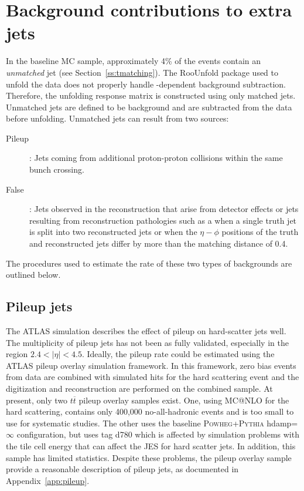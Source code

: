 \section{Background contributions to extra jets}
\label{ss:pileup}
In the baseline MC sample, approximately 4\% of the events contain an \textit{unmatched} jet (see Section~\ref{ss:tmatching}). The RooUnfold package used to unfold the data does not properly handle \pT-dependent background subtraction. Therefore, the unfolding response matrix is constructed using only matched jets. Unmatched jets are defined to be background and are subtracted from the data before unfolding. 
Unmatched jets can result from two sources: 
\begin{description}
\item[Pileup]: Jets coming from additional proton-proton collisions within the same bunch crossing.
\item[False]: Jets observed in the reconstruction that arise from detector effects or jets resulting from reconstruction pathologies such as a when a single truth jet is split into two reconstructed jets or when the $\eta-\phi$ positions of the truth and reconstructed jets differ by more than the matching distance of 0.4.
\end{description}
The  procedures used to estimate the rate of these two types of backgrounds are outlined below.

\subsection{Pileup jets}


The ATLAS simulation describes the effect of pileup on hard-scatter jets well.~\cite{jetpile} The multiplicity of pileup jets has not been as fully validated, especially in the region $2.4 < |\eta| < 4.5$.  Ideally, the pileup rate could be
estimated using the ATLAS pileup overlay simulation framework.  In this framework,
zero bias events from data are combined with simulated hits for the hard scattering event
and the digitization and reconstruction are performed on the combined sample.  At present,
only two $t\overline t$ pileup overlay samples exist.  One, using \textsc{ MC@NLO} for the hard scattering,
contains only 400,000 no-all-hadronic events and is too small to use for
systematic studies.  The other uses the baseline \textsc{ Powheg+Pythia} hdamp=$\infty$
configuration, but uses tag d780 which  is affected by simulation problems with the tile cell 
energy that can affect the JES for hard scatter jets.  In addition, this sample has
limited statistics.   Despite these problems, the pileup overlay sample
provide a reasonable description of pileup jets, as documented in Appendix~\ref{app:pileup}.

